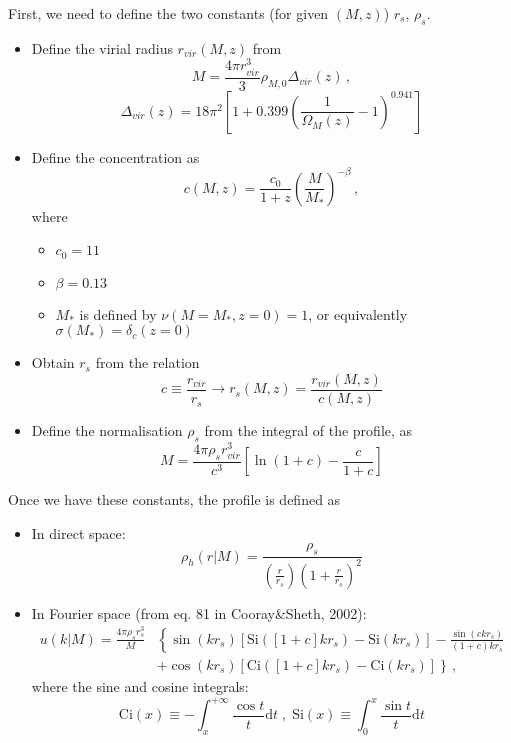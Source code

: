 \documentclass[10pt,a4paper]{article}
\begin{document}
First, we need to define the two constants (for given $(M,z)$) $r_s$, $\rho_s$.
\begin{itemize}
\item Define the virial radius $r_{vir}(M,z)$ from
\begin{equation}
\label{eq:mvir}
M = \frac{4 \pi r_{vir}^3}{3}\rho_{M,0} \Delta_{vir}(z) \, ,
\end{equation}
\begin{equation}
\Delta_{vir}(z) = 18\pi^2 \left[ 1 + 0.399\left( \frac{1}{\Omega_M(z)} - 1 \right)^{0.941} \right]
\end{equation}
\item Define the concentration as
\begin{equation}
c(M,z) = \frac{c_0}{1+z} \left( \frac{M}{M_*} \right)^{-\beta} \, ,
\end{equation}
where
\begin{itemize}
\item $c_0 = 11$
\item $\beta = 0.13$
\item $M_*$ is defined by $\nu(M=M_*, z=0) = 1$, or equivalently $\sigma(M_*) = \delta_c(z=0)$
\end{itemize}
\item Obtain $r_s$ from the relation
\begin{equation}
c \equiv \frac{r_{vir}}{r_s} \rightarrow r_s(M,z) = \frac{r_{vir}(M,z)}{c(M,z)}
\end{equation}
\item Define the normalisation $\rho_s$ from the integral of the profile, as
\begin{equation}
M = \frac{4 \pi \rho_s r_{vir}^3}{c^3} \left[\ln (1+c) - \frac{c}{1+c} \right]
\end{equation}
\end{itemize}


Once we have these constants, the profile is defined as
\begin{itemize}
\item In direct space:
\begin{equation}
\rho_h(r|M) = \frac{\rho_s}{\left(\frac{r}{r_s}\right)\left(1 + \frac{r}{r_s}\right)^2}
\end{equation}
\item In Fourier space (from eq. 81 in Cooray\&Sheth, 2002):
\begin{eqnarray}
u(k|M) = \frac{4 \pi \rho_s r_s^3}{M} & \left\lbrace  \sin(kr_s)\left[\mathrm{Si}\left([1+c]kr_s\right) - \mathrm{Si}(kr_s)\right] - \frac{\sin(ckr_s)}{(1+c)kr_s} \right. \\
& \left.  + \cos(kr_s)\left[\mathrm{Ci}\left([1+c]kr_s\right) - \mathrm{Ci}(kr_s)\right]\right\rbrace \, ,
\end{eqnarray}
where the sine and cosine integrals:
\begin{equation}
\mathrm{Ci}(x) \equiv - \int_x^{+\infty} \frac{\cos t}{t} \mathrm{d} t \; , \;
\mathrm{Si}(x) \equiv \int_0^x \frac{\sin t}{t} \mathrm{d} t
\end{equation}
\end{itemize}
\end{document}
